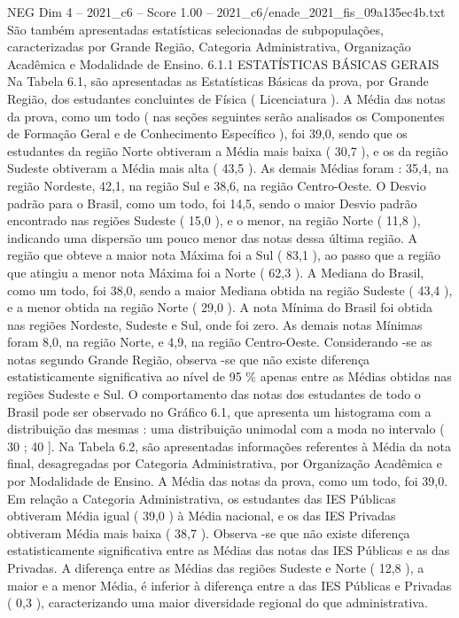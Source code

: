 \begin{textsample}{NEG Dim 4 – 2021\_c6 – Score 1.00 – 2021\_c6/enade\_2021\_fis\_09a135ec4b.txt}
São também apresentadas estatísticas selecionadas de subpopulações, caracterizadas por Grande Região, Categoria Administrativa, Organização Acadêmica e Modalidade de Ensino. 6.1.1 ESTATÍSTICAS BÁSICAS GERAIS Na Tabela 6.1, são apresentadas as Estatísticas Básicas da prova, por Grande Região, dos estudantes concluintes de Física ( Licenciatura ).
A Média das notas da prova, como um todo ( nas seções seguintes serão analisados os Componentes de Formação Geral e de Conhecimento Específico ), foi 39,0, sendo que os estudantes da região Norte obtiveram a Média mais baixa ( 30,7 ), e os da região Sudeste obtiveram a Média mais alta ( 43,5 ).
As demais Médias foram : 35,4, na região Nordeste, 42,1, na região Sul e 38,6, na região Centro-Oeste.
O Desvio padrão para o Brasil, como um todo, foi 14,5, sendo o maior Desvio padrão encontrado nas regiões Sudeste ( 15,0 ), e o menor, na região Norte ( 11,8 ), indicando uma dispersão um pouco menor das notas dessa última região.
A região que obteve a maior nota Máxima foi a Sul ( 83,1 ), ao passo que a região que atingiu a menor nota Máxima foi a Norte ( 62,3 ).
A Mediana do Brasil, como um todo, foi 38,0, sendo a maior Mediana obtida na região Sudeste ( 43,4 ), e a menor obtida na região Norte ( 29,0 ).
A nota Mínima do Brasil foi obtida nas regiões Nordeste, Sudeste e Sul, onde foi zero.
As demais notas Mínimas foram 8,0, na região Norte, e 4,9, na região Centro-Oeste.
Considerando -se as notas segundo Grande Região, observa -se que não existe diferença estatisticamente significativa ao nível de 95 \% apenas entre as Médias obtidas nas regiões Sudeste e Sul.
O comportamento das notas dos estudantes de todo o Brasil pode ser observado no Gráfico 6.1, que apresenta um histograma com a distribuição das mesmas : uma distribuição unimodal com a moda no intervalo ( 30 ; 40 ].
Na Tabela 6.2, são apresentadas informações referentes à Média da nota final, desagregadas por Categoria Administrativa, por Organização Acadêmica e por Modalidade de Ensino.
A Média das notas da prova, como um todo, foi 39,0.
Em relação a Categoria Administrativa, os estudantes das IES Públicas obtiveram Média igual ( 39,0 ) à Média nacional, e os das IES Privadas obtiveram Média mais baixa ( 38,7 ).
Observa -se que não existe diferença estatisticamente significativa entre as Médias das notas das IES Públicas e as das Privadas.
A diferença entre as Médias das regiões Sudeste e Norte ( 12,8 ), a maior e a menor Média, é inferior à diferença entre a das IES Públicas e Privadas ( 0,3 ), caracterizando uma maior diversidade regional do que administrativa.

\end{textsample}
